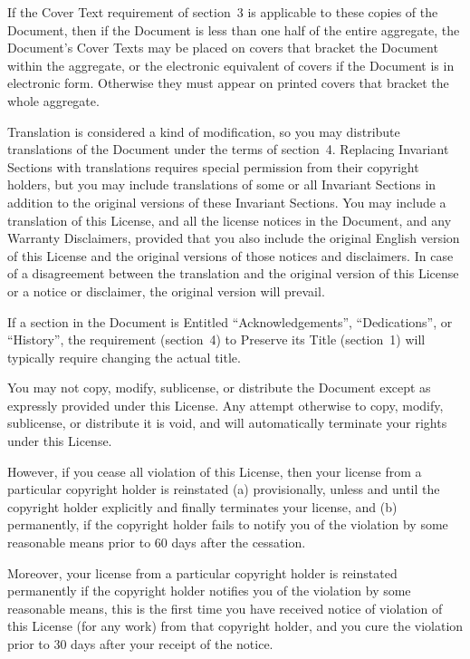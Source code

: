 \documentclass{article}
\begin{document}
If the Cover Text requirement of section~3 is applicable to these
copies of the Document, then if the Document is less than one half of
the entire aggregate, the Document's Cover Texts may be placed on
covers that bracket the Document within the aggregate, or the
electronic equivalent of covers if the Document is in electronic form.
Otherwise they must appear on printed covers that bracket the whole
aggregate.




Translation is considered a kind of modification, so you may
distribute translations of the Document under the terms of section~4.
Replacing Invariant Sections with translations requires special
permission from their copyright holders, but you may include
translations of some or all Invariant Sections in addition to the
original versions of these Invariant Sections.  You may include a
translation of this License, and all the license notices in the
Document, and any Warranty Disclaimers, provided that you also include
the original English version of this License and the original versions
of those notices and disclaimers.  In case of a disagreement between
the translation and the original version of this License or a notice
or disclaimer, the original version will prevail.

If a section in the Document is Entitled ``Acknowledgements'',
``Dedications'', or ``History'', the requirement (section~4) to Preserve
its Title (section~1) will typically require changing the actual
title.



You may not copy, modify, sublicense, or distribute the Document
except as expressly provided under this License.  Any attempt
otherwise to copy, modify, sublicense, or distribute it is void, and
will automatically terminate your rights under this License.

However, if you cease all violation of this License, then your license
from a particular copyright holder is reinstated (a) provisionally,
unless and until the copyright holder explicitly and finally
terminates your license, and (b) permanently, if the copyright holder
fails to notify you of the violation by some reasonable means prior to
60 days after the cessation.

Moreover, your license from a particular copyright holder is
reinstated permanently if the copyright holder notifies you of the
violation by some reasonable means, this is the first time you have
received notice of violation of this License (for any work) from that
copyright holder, and you cure the violation prior to 30 days after
your receipt of the notice.
\end{document}
